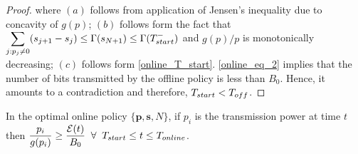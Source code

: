 \begin{proof}
where $(a)$ follows from application of Jensen's inequality due to concavity of $g(p)$; $(b)$ follows form the fact that $\displaystyle\sum_{j:p_j\neq 0}(s_{j+1}-s_{j})\le\TRx(s_{N+1})\le \TRx(T_{\mbox{\scriptsize{start}}}^-)$ and $g(p)/p$ is monotonically decreasing; $(c)$ follows form \eqref{online_T_start}. \eqref{online_eq_2} implies that the number of bits transmitted by the offline policy is less than $B_0$. Hence, it amounts to a contradiction and therefore, $T_{\mbox{\scriptsize{start}}}<T_{\mbox{\scriptsize{off}}}$.
\end{proof}
\begin{lemma}
In the optimal online policy $\{\bm{p},\bm{s},N\}$, if $p_i$ is the transmission power at time $t$ then $\dfrac{p_i}{g(p_i)} \ge \dfrac{\ETx(t)}{B_0}\;\;\forall\;\; T_{\mbox{\scriptsize{start}}}\le t\le T_{\mbox{\scriptsize{online}}}$.
\end{lemma}
